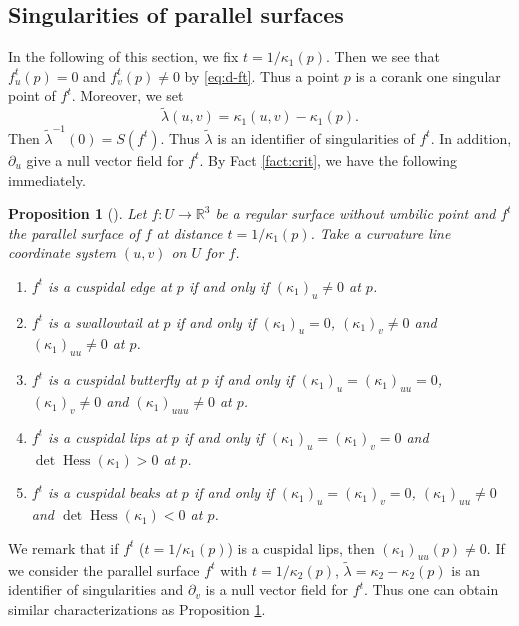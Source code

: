 \documentclass[11pt,a4paper,pdflatex,final]{amsart}
\theoremstyle{plain}
\newtheorem{proposition}[theorem]{Proposition}%
\theoremstyle{definition}
\theoremstyle{remark}
\newcommand{\hess}{\operatorname{Hess}}
\newcommand{\0}{\bm{0}}
\newcommand{\R}{\mathbb{R}}
\newcommand{\til}{\tilde}
\numberwithin{equation}{section}
\begin{document}
\subsection{Singularities of parallel surfaces}
In the following of this section, we fix $t=1/\kappa_1(p)$. 
Then we see that 
$f^t_u(p)=0$ and $f^t_v(p)\neq0$ by \eqref{eq:d-ft}. 
Thus a point $p$ is a corank one singular point of $f^t$. 
Moreover, we set 
\begin{equation}\label{eq:cpc}
\til{\lambda}(u,v)=\kappa_1(u,v)-\kappa_1(p).
\end{equation}
Then $\til{\lambda}^{-1}(0)=S(f^t)$. 
Thus $\til{\lambda}$ is an identifier of singularities of $f^t$. 
In addition, $\partial_u$ give a null vector field for $f^t$.
By Fact \ref{fact:crit}, we have the following immediately. 
\begin{proposition}[{\cite[Theorems 3.4 and 3.5]{fh-para}}]\label{prop:lips/beaks}
Let $f\colon U\to\R^3$ be a regular surface without umbilic point 
and $f^t$ the parallel surface of $f$ at distance $t=1/\kappa_1(p)$. 
Take a curvature line coordinate system $(u,v)$ on $U$ for $f$. 
\begin{enumerate}[label={\rm(\arabic*)}]
	\item $f^t$ is a cuspidal edge at $p$ 
	if and only if $(\kappa_1)_u\neq0$ at $p$.
	\item $f^t$ is a swallowtail at $p$ 
	if and only if $(\kappa_1)_u=0$, $(\kappa_1)_v\neq0$ and $(\kappa_1)_{uu}\neq0$ at $p$.
	\item $f^t$ is a cuspidal butterfly at $p$ 
	if and only if 
	$(\kappa_1)_u=(\kappa_1)_{uu}=0$, $(\kappa_1)_v\neq0$ and $(\kappa_1)_{uuu}\neq0$ at $p$.
	\item $f^t$ is a cuspidal lips at $p$ 
	if and only if $(\kappa_1)_u=(\kappa_1)_v=0$ and 
	$\det\hess(\kappa_1)>0$ at $p$.
	\item $f^t$ is a cuspidal beaks at $p$ 
	if and only if $(\kappa_1)_u=(\kappa_1)_v=0$, 
	$(\kappa_1)_{uu}\neq0$ and
	$\det\hess(\kappa_1)<0$ at $p$.
\end{enumerate} 
\end{proposition}
{ 
We remark that if $f^t$ ($t=1/\kappa_1(p)$) is a cuspidal lips, 
then $(\kappa_1)_{uu}(p)\neq0$. 
If we consider the parallel surface $f^t$ with $t=1/\kappa_2(p)$, 
$\til{\lambda}=\kappa_2-\kappa_2(p)$ is an identifier of singularities 
and $\partial_v$ is a null vector field for $f^t$. 
Thus one can obtain similar characterizations as Proposition \ref{prop:lips/beaks}.}
\end{document}
